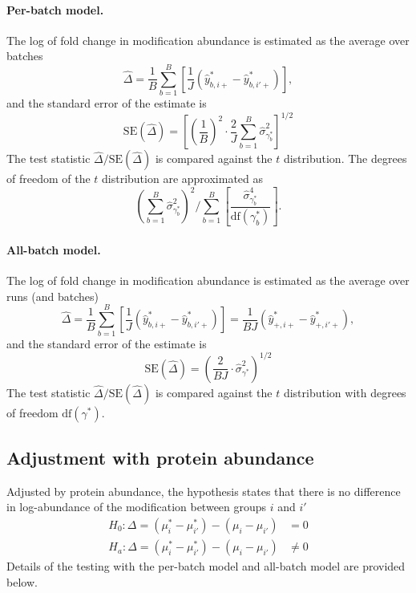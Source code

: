 \documentclass{mcp}
\begin{document}
\paragraph{Per-batch model.} 
The log of fold change in modification abundance is estimated as the average over batches
\[
\hat{\Delta} = \frac{1}{B} \sum_{b=1}^{B} \left[ \frac{1}{J} \left( \hat{y}_{b,i+}^{\ast} - \hat{y}_{b,i'+}^{\ast} \right) \right],
\]
and the standard error of the estimate is 
\[
\mathrm{SE}(\hat{\Delta}) = \left[ \left(\frac{1}{B}\right)^2 \cdot \frac{2}{J} \sum_{b=1}^{B} \hat{\sigma}_{\gamma_b^{\ast}}^{2} \right]^{1/2}
\]
The test statistic $\hat{\Delta} / \mathrm{SE}(\hat{\Delta})$ is compared against the $t$ distribution. The degrees of freedom of the $t$ distribution are approximated as
\[
\left( \sum_{b=1}^{B} \hat{\sigma}_{\gamma_{b}^{\ast}}^{2} \right)^2 \bigg/
\sum_{b=1}^{B} \left[  \frac{\hat{\sigma}_{\gamma_{b}^{\ast}}^{4}}{ \mathrm{df}(\gamma_b^{\ast}) } \right].
\]


\paragraph{All-batch model.}
The log of fold change in modification abundance is estimated as the average over runs (and batches)
\[
\hat{\Delta} = \frac{1}{B} \sum_{b=1}^{B} \left[ \frac{1}{J} \left( \hat{y}_{b,i+}^{\ast} - \hat{y}_{b,i'+}^{\ast} \right) \right]
= \frac{1}{BJ} \left( \hat{y}_{+,i+}^{\ast} - \hat{y}_{+,i'+}^{\ast} \right),
\]
and the standard error of the estimate is 
\[
\mathrm{SE}(\hat{\Delta}) = \left( \frac{2}{BJ} \cdot \hat{\sigma}_{\gamma^{\ast}}^{2} \right)^{1/2}
\]
The test statistic $\hat{\Delta} / \mathrm{SE}(\hat{\Delta})$ is compared against the $t$ distribution with degrees of freedom $\mathrm{df}(\gamma^{\ast})$.


\subsection{Adjustment with protein abundance}

Adjusted by protein abundance, the hypothesis states that there is no difference in log-abundance of the modification between groups $i$ and $i'$
\begin{align*}
H_{0}: \Delta = \left( \mu_{i}^{\ast} - \mu_{i'}^{\ast} \right) - \left( \mu_{i} - \mu_{i'} \right) &= 0 \\
H_{a}: \Delta = \left( \mu_{i}^{\ast} - \mu_{i'}^{\ast} \right) - \left( \mu_{i} - \mu_{i'} \right) &\neq 0
\end{align*}
Details of the testing with the per-batch model and all-batch model are provided below.
\end{document}
